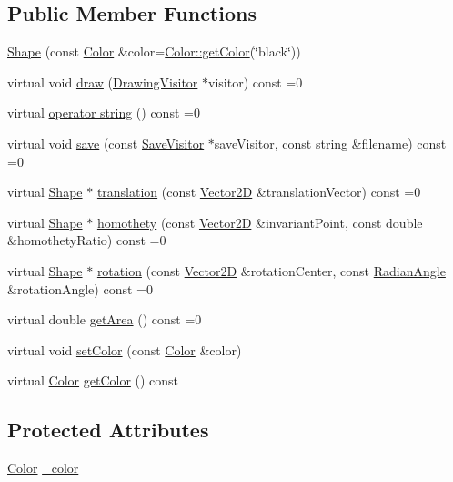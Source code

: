 \subsection*{Public Member Functions}
\begin{DoxyCompactItemize}
\item 
\hyperlink{class_shape_a6a2e4f913c228a1a167062035ba7e898}{Shape} (const \hyperlink{class_color}{Color} \&color=\hyperlink{class_color_a94697e8c9eb81124c5a7c1439e1e7348}{Color\+::get\+Color}(\char`\"{}black\char`\"{}))
\item 
virtual void \hyperlink{class_shape_ae67fc6d39dd33759b65ff6112b21eab7}{draw} (\hyperlink{class_drawing_visitor}{Drawing\+Visitor} $\ast$visitor) const =0
\item 
virtual \hyperlink{class_shape_a0d74dcb2db0791b88b92f439bf4a6972}{operator string} () const =0
\item 
virtual void \hyperlink{class_shape_ae1477829e1b06aad805b8b76312f87bc}{save} (const \hyperlink{class_save_visitor}{Save\+Visitor} $\ast$save\+Visitor, const string \&filename) const =0
\item 
virtual \hyperlink{class_shape}{Shape} $\ast$ \hyperlink{class_shape_ad3daca0d9bedf9aa15b92afab63c1de8}{translation} (const \hyperlink{class_vector2_d}{Vector2D} \&translation\+Vector) const =0
\item 
virtual \hyperlink{class_shape}{Shape} $\ast$ \hyperlink{class_shape_a91f18af3004ba210db5c91084c50beb9}{homothety} (const \hyperlink{class_vector2_d}{Vector2D} \&invariant\+Point, const double \&homothety\+Ratio) const =0
\item 
virtual \hyperlink{class_shape}{Shape} $\ast$ \hyperlink{class_shape_abfc7a673b8a6d9a4d646dc15c771aa0d}{rotation} (const \hyperlink{class_vector2_d}{Vector2D} \&rotation\+Center, const \hyperlink{class_radian_angle}{Radian\+Angle} \&rotation\+Angle) const =0
\item 
virtual double \hyperlink{class_shape_ad9454ee04617290547e7529180b1beae}{get\+Area} () const =0
\item 
virtual void \hyperlink{class_shape_a9f3d9c69476b41a375161b27949f765c}{set\+Color} (const \hyperlink{class_color}{Color} \&color)
\item 
virtual \hyperlink{class_color}{Color} \hyperlink{class_shape_a6ab685fc0e6aeec5d2e9743f5ecd66a4}{get\+Color} () const
\end{DoxyCompactItemize}
\subsection*{Protected Attributes}
\begin{DoxyCompactItemize}
\item 
\hyperlink{class_color}{Color} \hyperlink{class_shape_a5b499b01e45f0dbd8bbc64172f169213}{\+\_\+color}
\end{DoxyCompactItemize}
